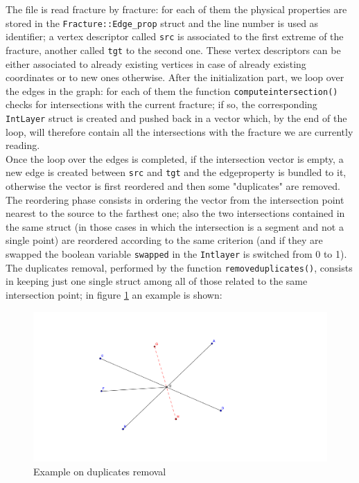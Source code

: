 \documentclass[10pt]{article} %
\begin{document}
	The file is read fracture by fracture: for each of them the physical properties are stored in the \texttt{Fracture::Edge\_prop} struct and the line number is used as identifier; a vertex descriptor called \texttt{src} is associated to the first extreme of the fracture, another called \texttt{tgt} to the second one. These vertex descriptors can be either associated to already existing vertices in case of already existing coordinates or to new ones otherwise. After the initialization part, we loop over the edges in the graph: for each of them the function \texttt{compute\textunderscore intersection()} checks for intersections with the current fracture; if so, the corresponding \texttt{Int\textunderscore Layer} struct is created and pushed back in a vector which, by the end of the loop, will therefore contain all the intersections with the fracture we are currently reading. \\
	Once the loop over the edges is completed, if the intersection vector is empty, a new edge is created between \texttt{src} and \texttt{tgt} and the edge\textunderscore property is bundled to it, otherwise the vector is first reordered and then some "duplicates" are removed.
	The reordering phase consists in ordering the vector from the intersection point nearest to the source to the farthest one; also the two intersections contained in the same struct (in those cases in which the intersection is a segment and not a single point) are reordered according to the same criterion (and if they are swapped the boolean variable \texttt{swapped} in the \texttt{Int\textunderscore layer} is switched from 0 to 1).
	The duplicates removal, performed by the function \texttt{remove\textunderscore duplicates()}, consists in keeping just one single struct among all of those related to the same intersection point; in figure \ref{fig:rem_dupl} an example is shown: 
	\begin{figure}
		\centering 
		\includegraphics[width=.8\textwidth]{rem_dupl}
		\caption{Example on duplicates removal}
		\label{fig:rem_dupl}
	\end{figure}
\end{document}
